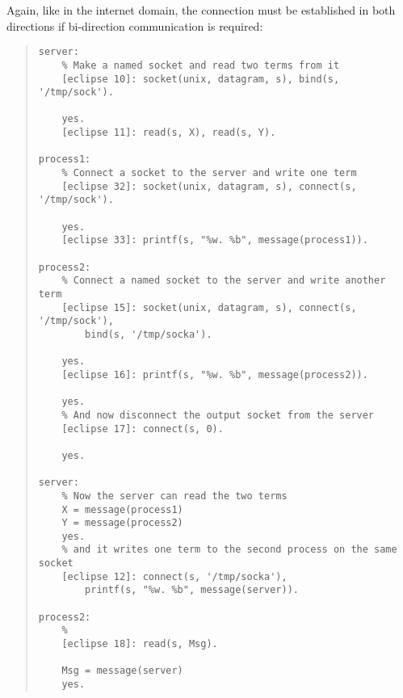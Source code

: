 Again, like in the internet domain, the connection must be established
in both directions if bi-direction communication is required:
\begin{quote}
\begin{verbatim}
server:
    % Make a named socket and read two terms from it
    [eclipse 10]: socket(unix, datagram, s), bind(s, '/tmp/sock').

    yes.
    [eclipse 11]: read(s, X), read(s, Y).

process1:
    % Connect a socket to the server and write one term
    [eclipse 32]: socket(unix, datagram, s), connect(s, '/tmp/sock').

    yes.
    [eclipse 33]: printf(s, "%w. %b", message(process1)).

process2:
    % Connect a named socket to the server and write another term
    [eclipse 15]: socket(unix, datagram, s), connect(s, '/tmp/sock'),
        bind(s, '/tmp/socka').

    yes.
    [eclipse 16]: printf(s, "%w. %b", message(process2)).

    yes.
    % And now disconnect the output socket from the server
    [eclipse 17]: connect(s, 0).

    yes.

server:
    % Now the server can read the two terms
    X = message(process1)
    Y = message(process2)
    yes.
    % and it writes one term to the second process on the same socket
    [eclipse 12]: connect(s, '/tmp/socka'),
        printf(s, "%w. %b", message(server)).

process2:
    %
    [eclipse 18]: read(s, Msg).

    Msg = message(server)
    yes.
\end{verbatim}
\end{quote}

